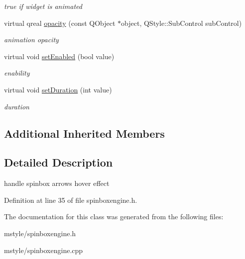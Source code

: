 \begin{DoxyCompactItemize}
\begin{DoxyCompactList}\small\item\em true if widget is animated \end{DoxyCompactList}\item 
\mbox{\label{class_spin_box_engine_aac28191d8007663c9eda36d993760db2}} 
virtual qreal \hyperlink{class_spin_box_engine_aac28191d8007663c9eda36d993760db2}{opacity} (const Q\+Object $\ast$object, Q\+Style\+::\+Sub\+Control sub\+Control)
\begin{DoxyCompactList}\small\item\em animation opacity \end{DoxyCompactList}\item 
\mbox{\label{class_spin_box_engine_a7c28bb260daf81341fea79f832fb04ce}} 
virtual void \hyperlink{class_spin_box_engine_a7c28bb260daf81341fea79f832fb04ce}{set\+Enabled} (bool value)
\begin{DoxyCompactList}\small\item\em enability \end{DoxyCompactList}\item 
\mbox{\label{class_spin_box_engine_a43db55d31692eddacc088b2cebdaa6e2}} 
virtual void \hyperlink{class_spin_box_engine_a43db55d31692eddacc088b2cebdaa6e2}{set\+Duration} (int value)
\begin{DoxyCompactList}\small\item\em duration \end{DoxyCompactList}\end{DoxyCompactItemize}
\subsection*{Additional Inherited Members}


\subsection{Detailed Description}
handle spinbox arrows hover effect 

Definition at line 35 of file spinboxengine.\+h.



The documentation for this class was generated from the following files\+:\begin{DoxyCompactItemize}
\item 
mstyle/spinboxengine.\+h\item 
mstyle/spinboxengine.\+cpp\end{DoxyCompactItemize}
